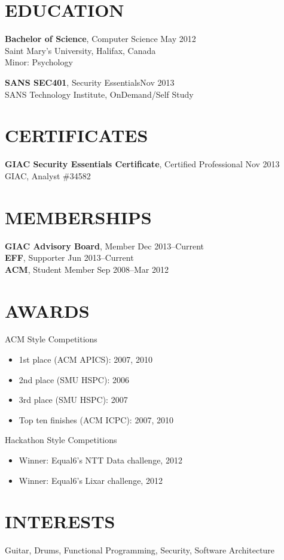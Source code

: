\documentclass[line,margin]{res}
\begin{document}
\begin{resume}
\section{EDUCATION}
\textbf{Bachelor of Science}, Computer Science \hfill May 2012 \\
Saint Mary's University, Halifax, Canada \\
Minor: Psychology

\textbf{SANS SEC401}, Security Essentials\hfill Nov 2013 \\
SANS Technology Institute, OnDemand/Self Study

\section{CERTIFICATES}
\textbf{GIAC Security Essentials Certificate}, Certified Professional \hfill Nov 2013 \\
GIAC, Analyst \#34582

\section{MEMBERSHIPS}
\textbf{GIAC Advisory Board}, Member \hfill Dec 2013--Current \\
\textbf{EFF}, Supporter \hfill Jun 2013--Current \\
\textbf{ACM}, Student Member \hfill Sep 2008--Mar 2012

\section{AWARDS}
ACM Style Competitions
\begin{itemize} \itemsep-2pt
    \item 1st place (ACM APICS): 2007, 2010
    \item 2nd place (SMU HSPC): 2006
    \item 3rd place (SMU HSPC): 2007
    \item Top ten finishes (ACM ICPC): 2007, 2010
\end{itemize}

Hackathon Style Competitions
\begin{itemize} \itemsep-2pt
    \item Winner: Equal6's NTT Data challenge, 2012
    \item Winner: Equal6's Lixar challenge, 2012
\end{itemize}

\section{INTERESTS}
Guitar, Drums, Functional Programming, Security, Software Architecture

\end{resume}
\end{document}
